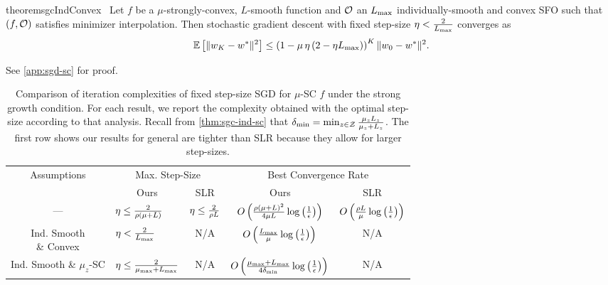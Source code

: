 \begin{restatable}{theorem}{sgcIndConvex}~\label{thm:sgc-ind-convex}
    Let \( f \) be a \( \mu \)-strongly-convex, \( L \)-smooth function and \( \oracle{} \) an \( \Lmax \) individually-smooth and convex \ac{SFO} such that \( \rbr{f, \oracle{}} \) satisfies minimizer interpolation.
    Then stochastic gradient descent with fixed step-size \( \eta < \frac{2}{\Lmax} \) converges as
    \[ \E\sbr{\norm{\w_{K} - \wopt}^2} \leq \rbr{1 - \mu \, \eta \rbr{2 - \eta \Lmax}}^K \norm{\w_0 - \wopt}^2. \]
\end{restatable}
\noindent See \autoref{app:sgd-sc} for proof.\hfill \break

\begin{table}[t]
    \centering
    \begin{tabular}{c l l c c  }\toprule
        \multirow{2}{*}{Assumptions} & \multicolumn{2}{c}{Max. Step-Size}  & \multicolumn{2}{c}{Best Convergence Rate}\\%
        \cmidrule(lr){2-3} \cmidrule(l){4-5}
                 & \multicolumn{1}{c}{Ours} & \multicolumn{1}{c}{SLR} & \multicolumn{1}{c}{Ours} & \multicolumn{1}{c}{SLR}\\ \midrule
     — & \( \eta \leq \frac{2}{\sgc\rbr{\mu + L}} \)%
                 & \( \eta \leq \frac{2}{\sgc L} \)%
                 & \( O\rbr{\frac{\rho{(\mu + L)}^2}{4\mu L} \log\rbr{\inv{\epsilon}}} \)%
                 & \( O\rbr{\frac{\rho L}{\mu} \log\rbr{\inv{\epsilon}}} \) \\ \addlinespace
    \makecell{Ind. Smooth \\ \& Convex}%
                 & \( \eta < \frac{2}{\Lmax} \)%
                 & \multicolumn{1}{c}{N/A}%
                 & \( O\rbr{\frac{\Lmax}{\mu}\log\rbr{\inv{\epsilon}}} \)%
                 & \multicolumn{1}{c}{N/A}\\ \addlinespace 
    \makecell{Ind. Smooth \\ \& \(\mu_z\)-SC}%
                 & \( \eta \leq \frac{2}{\mumax + \Lmax} \)%
                 & \multicolumn{1}{c}{N/A}%
                 & \( O\rbr{\frac{\mumax + \Lmax}{4 \delta_{\text{min}}} \log\rbr{\frac{1}{\epsilon}}} \)%
                 & \multicolumn{1}{c}{N/A} \\ \bottomrule 
    \end{tabular}
    \caption[Comparison of iteration complexities of fixed step-size stochastic gradient descent for strongly-convex functions under strong growth.]%
    {Comparison of iteration complexities of fixed step-size \ac{SGD} for \( \mu \)-SC \( f \) under the strong growth condition.
     For each result, we report the complexity obtained with the optimal step-size according to that analysis.
    Recall from \autoref{thm:sgc-ind-sc} that \( \delta_{\text{min}} = \min_{\z \in \calZ} \frac{\mu_\z L_\z}{\mu_\z + L_\z} \).
     The first row shows our results for general \oracle{} are tighter than SLR \citep{schmidt2013fast} because they allow for larger step-sizes.}%
    \label{table:sgd-sc-comparison}
\end{table}

